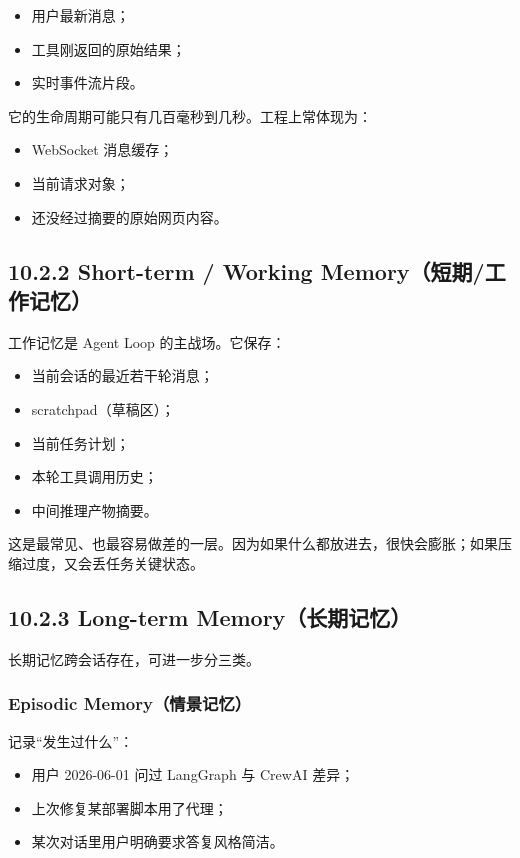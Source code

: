 \begin{itemize}[leftmargin=2em]
\item 用户最新消息；
\item 工具刚返回的原始结果；
\item 实时事件流片段。
\end{itemize}

它的生命周期可能只有几百毫秒到几秒。工程上常体现为：


\begin{itemize}[leftmargin=2em]
\item WebSocket 消息缓存；
\item 当前请求对象；
\item 还没经过摘要的原始网页内容。
\end{itemize}

\subsection{10.2.2 Short-term / Working Memory（短期/工作记忆）}

工作记忆是 Agent Loop 的主战场。它保存：


\begin{itemize}[leftmargin=2em]
\item 当前会话的最近若干轮消息；
\item scratchpad（草稿区）；
\item 当前任务计划；
\item 本轮工具调用历史；
\item 中间推理产物摘要。
\end{itemize}

这是最常见、也最容易做差的一层。因为如果什么都放进去，很快会膨胀；如果压缩过度，又会丢任务关键状态。


\subsection{10.2.3 Long-term Memory（长期记忆）}

长期记忆跨会话存在，可进一步分三类。


\subsubsection{Episodic Memory（情景记忆）}

记录``发生过什么''：


\begin{itemize}[leftmargin=2em]
\item 用户 2026-06-01 问过 LangGraph 与 CrewAI 差异；
\item 上次修复某部署脚本用了代理；
\item 某次对话里用户明确要求答复风格简洁。
\end{itemize}

